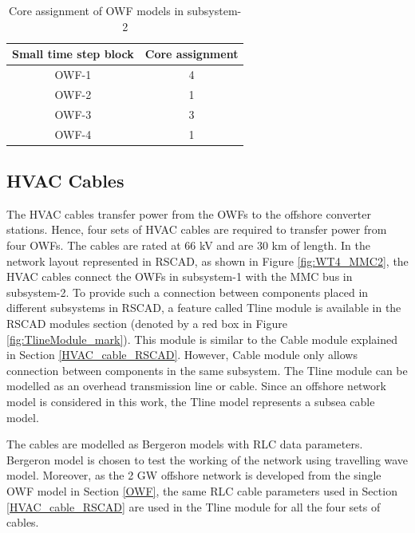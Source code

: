 \begin{table}[H]
\centering
\begin{tabular}{|c|c|}
\hline
\textbf{Small time step block} & \textbf{Core assignment} \\ \hline
OWF-1                          & 4                        \\ \hline
OWF-2                          & 1                        \\ \hline
OWF-3                          & 3                        \\ \hline
OWF-4                          & 1                        \\ \hline
\end{tabular}
\caption{Core assignment of OWF models in subsystem-2}
\label{tab:Core_assignment_sub2}
\end{table}

\subsection{HVAC Cables}\label{Tline_cable_RSCAD}
The \gls{HVAC} cables transfer power from the \gls{OWF}s to the offshore converter stations. Hence, four sets of \gls{HVAC} cables are required to transfer power from four \gls{OWF}s. The cables are rated at 66 kV and are 30 km of length. In the network layout represented in RSCAD, as shown in Figure \ref{fig:WT4_MMC2}, the \gls{HVAC} cables connect the \gls{OWF}s in subsystem-1 with the \gls{MMC} bus in subsystem-2. To provide such a connection between components placed in different subsystems in RSCAD, a feature called Tline module is available in the RSCAD modules section (denoted by a red box in Figure \ref{fig:TlineModule_mark}). This module is similar to the Cable module explained in Section \ref{HVAC_cable_RSCAD}. However, Cable module only allows connection between components in the same subsystem. The Tline module can be modelled as an overhead transmission line or cable. Since an offshore network model is considered in this work, the Tline model represents a subsea cable model. 

The cables are modelled as Bergeron models with RLC data parameters. Bergeron model is chosen to test the working of the network using travelling wave model. Moreover, as the 2 GW offshore network is developed from the single \gls{OWF} model in Section \ref{OWF}, the same RLC cable parameters used in Section \ref{HVAC_cable_RSCAD} are used in the Tline module for all the four sets of cables. 
 
